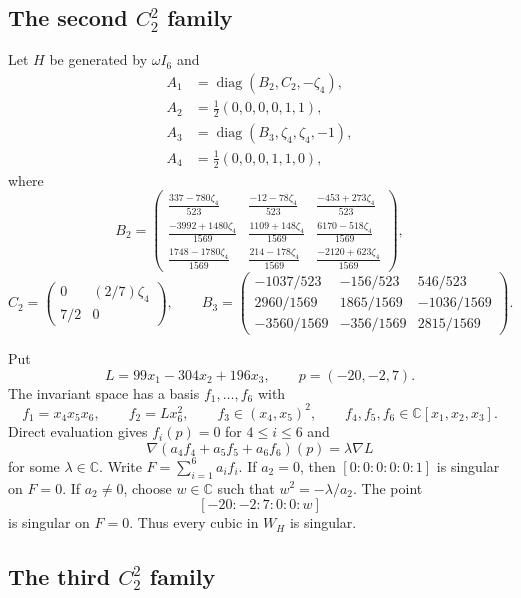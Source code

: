 \documentclass[12pt]{amsart}
\numberwithin{equation}{section}
\theoremstyle{plain}
\theoremstyle{definition}
\theoremstyle{remark}
\newcommand{\CC}{\mathbb C}
\DeclareMathOperator{\diag}{diag}
\begin{document}
\subsection{The second $C_2^2$ family}

Let $H$ be generated by $\omega I_6$ and
\begin{align*}
 A_1&=\diag(B_2,C_2,-\zeta _4),\\
 A_2&=\frac12(0,0,0,0,1,1),\\
 A_3&=\diag(B_3,\zeta _4,\zeta _4,-1),\\
 A_4&=\frac12(0,0,0,1,1,0),
\end{align*}
where
\[
 B_2=
 \begin{pmatrix}
 \frac{337-780\zeta _4}{523}&\frac{-12-78\zeta _4}{523}&
   \frac{-453+273\zeta _4}{523}\\
 \frac{-3992+1480\zeta _4}{1569}&\frac{1109+148\zeta _4}{1569}&
   \frac{6170-518\zeta _4}{1569}\\
 \frac{1748-1780\zeta _4}{1569}&\frac{214-178\zeta _4}{1569}&
   \frac{-2120+623\zeta _4}{1569}
 \end{pmatrix},
\]
\[
 C_2=\begin{pmatrix}0&(2/7)\zeta _4\\7/2&0\end{pmatrix},
 \qquad
 B_3=
 \begin{pmatrix}
 -1037/523&-156/523&546/523\\
 2960/1569&1865/1569&-1036/1569\\
 -3560/1569&-356/1569&2815/1569
 \end{pmatrix}.
\]

Put
\[
 L=99x_1-304x_2+196x_3,\qquad
 p=(-20,-2,7).
\]
The invariant space has a basis $f_1,\ldots,f_6$ with
\[
 f_1=x_4x_5x_6,\qquad f_2=Lx_6^2,\qquad
 f_3\in(x_4,x_5)^2,\qquad
 f_4,f_5,f_6\in\CC[x_1,x_2,x_3].
\]
Direct evaluation gives $f_i(p)=0$ for $4\leq i\leq6$ and
\[
 \nabla(a_4f_4+a_5f_5+a_6f_6)(p)=\lambda\nabla L
\]
for some $\lambda\in\CC$.  Write $F=\sum_{i=1}^6a_if_i$.
If $a_2=0$, then $[0:0:0:0:0:1]$ is singular on $F=0$.  If
$a_2\neq0$, choose $w\in\CC$ such that $w^2=-\lambda/a_2$.  The point
\[
 [-20:-2:7:0:0:w]
\]
is singular on $F=0$. Thus every cubic in $W_H$ is singular.

\subsection{The third $C_2^2$ family}
\end{document}
